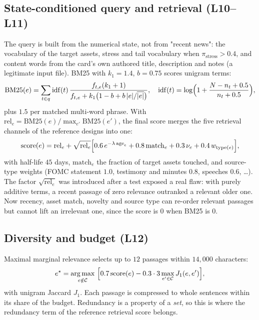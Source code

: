 \subsection{State-conditioned query and retrieval (L10--L11)}

The query is built from the numerical state, not from "recent news": the vocabulary of the target assets, stress and tail vocabulary when
$\pi_{\text{stress}}>0.4$, and content words from the card's own authored title, description and notes (a legitimate input file). BM25 with
$k_1=1.4$, $b=0.75$ scores unigram terms:
\begin{equation}
  \mathrm{BM25}(e)=\sum_{t\in q}\mathrm{idf}(t)\,\frac{f_{t,e}(k_1+1)}{f_{t,e}+k_1\bigl(1-b+b\,|e|/\overline{|e|}\bigr)},\quad
  \mathrm{idf}(t)=\log\Bigl(1+\frac{N-n_t+0.5}{n_t+0.5}\Bigr),
\end{equation}
plus $1.5$ per matched multi-word phrase. With $\mathrm{rel}_e=\mathrm{BM25}(e)/\max_{e'}\mathrm{BM25}(e')$, the final score merges the five
retrieval channels of the reference designs into one:
\begin{equation}\label{eq:retr}
  \mathrm{score}(e)=\mathrm{rel}_e+\sqrt{\mathrm{rel}_e}\Bigl[0.6\,e^{-\lambda\,\mathrm{age}_e}+0.8\,\mathrm{match}_e+0.3\,\nu_e+0.4\,w_{\mathrm{type}(e)}\Bigr],
\end{equation}
with half-life $45$ days, $\mathrm{match}_e$ the fraction of target assets touched, and source-type weights (FOMC statement $1.0$, testimony and
minutes $0.8$, speeches $0.6$, \ldots). The factor $\sqrt{\mathrm{rel}_e}$ was introduced after a test exposed a real flaw: with purely additive
terms, a recent passage of zero relevance outranked a relevant older one. Now recency, asset match, novelty and source type can re-order relevant
passages but cannot lift an irrelevant one, since the score is $0$ when BM25 is $0$.

\subsection{Diversity and budget (L12)}

Maximal marginal relevance selects up to $12$ passages within $14{,}000$ characters:
\begin{equation}
  e^\star=\argmax_{e\notin\mathcal C}\ \Bigl[0.7\,\mathrm{score}(e)-0.3\cdot3\max_{e'\in\mathcal C}J_1(e,e')\Bigr],
\end{equation}
with unigram Jaccard $J_1$. Each passage is compressed to whole sentences within its share of the budget. Redundancy is a property of a
\emph{set}, so this is where the redundancy term of the reference retrieval score belongs.

